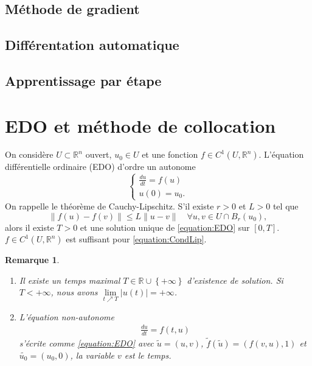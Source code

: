\documentclass[11pt,a4paper]{article}
\newcommand{\R}{\mathbb R}
\newcommand{\abs}[1]{\left|#1\right|}
\newcommand{\norm}[1]{\|#1\|}
\newcommand{\Set}[1]{\left\{#1\right\}}
\newtheorem{remark}[theorem]{Remarque}
\begin{document}
\subsection{Méthode de gradient}\label{subsec:}
%
%
\subsection{Différentation automatique}\label{subsec:}
%
%
\subsection{Apprentissage par étape}\label{subsec:}
%
%
%
\section{EDO et méthode de collocation}\label{sec:}
%
On considère $U\subset \R^n$ ouvert, $u_0\in U$ et une fonction $f\in C^1(U,\R^n)$. L'équation différentielle ordinaire (EDO) d'ordre un autonome
%
\begin{equation}\label{equation:EDO}
\left\{
\begin{aligned}
\frac{du}{dt} = f(u)\\
u(0) = u_0.
\end{aligned}
\right.
\end{equation}
%
On rappelle le théorème de Cauchy-Lipschitz. S'il existe $r>0$ et $L>0$ tel que
%
\begin{equation}\label{equation:CondLip}
\norm{f(u)-f(v)}\le L\norm{u-v}\quad \forall u,v\in U\cap B_r(u_0),
\end{equation}
%
alors il existe $T>0$ et une solution unique de \eqref{equation:EDO} sur $[0,T]$. $f\in C^1(U,\R^n)$ est suffisant pour \eqref{equation:CondLip}.
%
%
\begin{remark}\label{remark:}
\begin{enumerate}
\item Il existe un temps maximal $T\in\R\cup\Set{+\infty}$ d'existence de solution. Si $T<+\infty$, nous avons $\lim\limits_{t\nearrow T}\abs{u(t)}=+\infty$.
\item L'équation non-autonome
\begin{align*}
\frac{du}{dt} = f(t,u)
\end{align*}
 s'écrite comme \eqref{equation:EDO} avec $\widetilde{u} = (u, v)$, $\widetilde{f}(\widetilde{u}) = (f(v,u),1)$ et $\widetilde{u_0}=(u_0,0)$, la variable $v$ est le temps.
\end{enumerate}
\end{remark}
%
\end{document}
